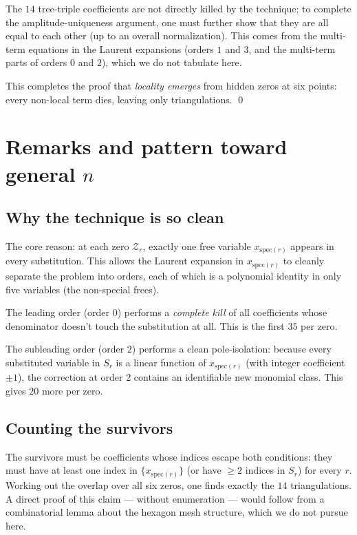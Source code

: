 \documentclass[11pt]{article}
\newcommand{\Z}{\mathcal{Z}}
\newcommand{\spec}{\mathrm{spec}}
\theoremstyle{definition}
\begin{document}
The $14$ tree-triple coefficients are not directly killed by the technique; to
complete the amplitude-uniqueness argument, one must further show that they
are all equal to each other (up to an overall normalization). This comes from
the multi-term equations in the Laurent expansions (orders $1$ and $3$, and
the multi-term parts of orders $0$ and $2$), which we do not tabulate here.

This completes the proof that \emph{locality emerges} from hidden zeros at six
points: every non-local term dies, leaving only triangulations.
\qed

\section{Remarks and pattern toward general $n$}

\subsection{Why the technique is so clean}

The core reason: at each zero $\Z_r$, exactly one free variable
$x_{\spec(r)}$ appears in every substitution. This allows the Laurent
expansion in $x_{\spec(r)}$ to cleanly separate the problem into orders,
each of which is a polynomial identity in only five variables
(the non-special frees).

The leading order (order $0$) performs a \emph{complete kill} of all
coefficients whose denominator doesn't touch the substitution at all. This
is the first $35$ per zero.

The subleading order (order $2$) performs a clean pole-isolation: because
every substituted variable in $S_r$ is a linear function of $x_{\spec(r)}$
(with integer coefficient $\pm 1$), the correction at order $2$ contains an
identifiable new monomial class. This gives $20$ more per zero.

\subsection{Counting the survivors}

The survivors must be coefficients whose indices escape both conditions: they
must have at least one index in $\{x_{\spec(r)}\}$ (or have $\ge 2$ indices in
$S_r$) for every $r$. Working out the overlap over all six zeros, one finds
exactly the $14$ triangulations. A direct proof of this claim --- without
enumeration --- would follow from a combinatorial lemma about the hexagon mesh
structure, which we do not pursue here.
\end{document}

